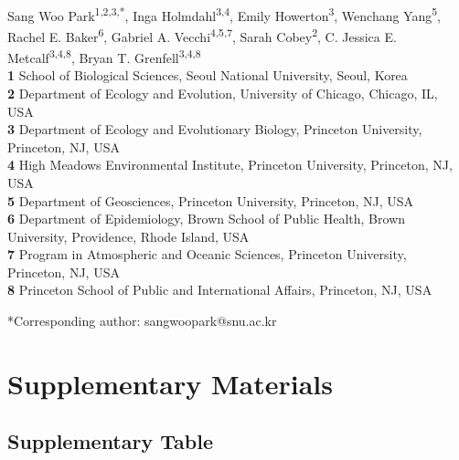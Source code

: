 \documentclass[12pt]{article}
\date{\today}
\begin{document}
\begin{flushleft}{
	\Large
	\textbf{}
}
\newline
\\
Sang Woo Park\textsuperscript{1,2,3,*}, Inga Holmdahl\textsuperscript{3,4}, Emily Howerton\textsuperscript{3}, Wenchang Yang\textsuperscript{5}, Rachel E. Baker\textsuperscript{6}, Gabriel A. Vecchi\textsuperscript{4,5,7}, Sarah Cobey\textsuperscript{2}, C. Jessica E. Metcalf\textsuperscript{3,4,8}, Bryan T. Grenfell\textsuperscript{3,4,8}
\\
\bigskip
\textbf{1} School of Biological Sciences, Seoul National University, Seoul, Korea
\\
\textbf{2} Department of Ecology and Evolution, University of Chicago, Chicago, IL, USA
\\
\textbf{3} Department of Ecology and Evolutionary Biology, Princeton University, Princeton, NJ, USA
\\
\textbf{4} High Meadows Environmental Institute, Princeton University, Princeton, NJ, USA
\\
\textbf{5} Department of Geosciences, Princeton University, Princeton, NJ, USA
\\
\textbf{6} Department of Epidemiology, Brown School of Public Health, Brown University, Providence, Rhode Island, USA
\\
\textbf{7} Program in Atmospheric and Oceanic Sciences, Princeton University, Princeton, NJ, USA
\\
\textbf{8} Princeton School of Public and International Affairs, Princeton, NJ, USA
\bigskip

*Corresponding author: sangwoopark@snu.ac.kr
\end{flushleft}

\pagebreak

\setcounter{figure}{0}
\setcounter{equation}{0}
\renewcommand{\thefigure}{S\arabic{figure}}
\renewcommand{\theequation}{S\arabic{equation}}
\renewcommand{\thetable}{S\arabic{table}}

\section*{Supplementary Materials}

\subsection*{Supplementary Table}
\end{document}
